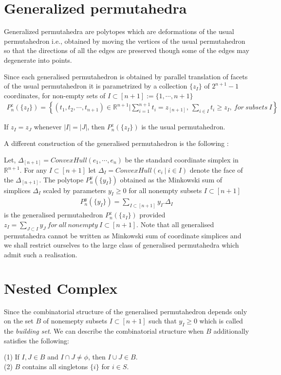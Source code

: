 \documentclass[hidelinks,12pt]{article}
\newcommand{\bea}[1]{\begin{eqnarray}\label{#1} }
\newcommand{\eea}{\end{eqnarray}}
\def\bea{\begin{eqnarray}}
\def\eea{\end{eqnarray}}
\begin{document}
\section*{Generalized permutahedra}
Generalized permutahedra are polytopes which are deformations of the usual permutahedron i.e., obtained by moving the vertices of the usual permutahedron so that the directions of all the edges are preserved though some of the edges may degenerate into points.

 Since each generalised permutahedron is obtained by parallel translation of facets of the usual permutahedron it is parametrized  by a collection $\{ z_I\}$ of $2^{n+1}-1$ coordinates, for non-empty sets of $I \subset [n+1] := \{1,\cdots,n+1 \}$
 \bea
 P_n^z(\{ z_I \}) = \left \{ (t_1, t_2, \cdots , t_{n+1}) \in \mathbb{R}^{n+1} | \sum_{i=1}^{n+1} t_i = z_{[n+1]},~ \sum_{i \in I} t_i \geq z_I, ~for ~subsets~ I  \right  \} \nonumber
 \eea
 
 If $z_I =z_J$ whenever $|I| =|J|$, then  $ P_n^z(\{ z_I \})$ is the usual permutahedron.
 
 
 A different construction of the generalised permutahedron is the following :
 
 Let, $\Delta_{[n+1]} = ConvexHull(e_1,\cdots,e_n)$ be the standard coordinate simplex in $\mathbb{R}^{n+1}$. For any $I \subset [n+1] $ let $\Delta_I =ConvexHull(e_i~|~i\in I)$ denote the face of the $\Delta_{[n+1]}$. The polytope $P_n^y(\{y_I \})$ obtained as the Minkowski sum of simplices $\Delta_I$ scaled by  parameters $y_I \geq 0$ for all nonempty subsets $I \subset [n+1]$
 \bea
 P_n^y(\{y_I \})= \sum_{I \subset[n+1]} y_I . \Delta_I  \nonumber
 \eea
is the generalised permutahedron $P_n^z(\{z_I \})$  provided $z_I = \sum_{J \subset I} y_J  ~ for ~all~nonempty ~I \subset [n+1]$.
Note that all generalised permutahedra cannot be written as Minkowski sum of coordinate simplices and we shall restrict ourselves to the large class of generalised permutahedra which admit such a realisation.
\section*{Nested Complex}
Since the combinatorial structure of the generalised permutahedron depends only on the set $B$ of nonemepty subsets $I \subset [n+1]$ such that $y_I \geq 0$ which is called the {\it building set}. We can describe the combinatorial structure when $B$ additionally satisfies the following:

\noindent(1) If $I,J \in B$ and $I \cap J \neq \phi $, then $I \cup J \in B$. \\
(2) $B$ contains all singletons $\{ i\}$ for $i \in S$.
\end{document}
